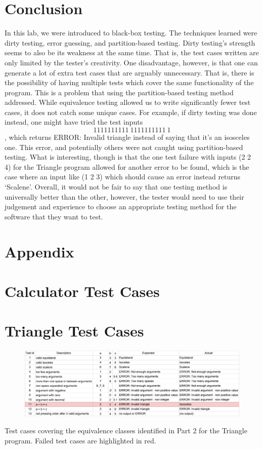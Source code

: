\documentclass[letterpaper]{article}
\begin{document}
\section*{Conclusion}
In this lab, we were introduced to black-box testing. The techniques
learned were dirty testing, error guessing, and partition-based testing.
Dirty testing's strength seems to also be its weakness at the same time. That is,
the test cases written are only limited by the tester's creativity.
One disadvantage, however, is that one can generate a lot of extra test cases
that are arguably unnecessary. That is, there is the possibility of having multiple
tests which cover the same functionality of the program. This is a problem that
using the partition-based testing method addressed. While equivalence testing allowed us 
to write significantly fewer test cases,
it does not catch some unique cases. For example, if dirty testing was done instead,
one might have tried the test inputs $$1111111111\ 1111111111\ 1$$, which returns ERROR: Invalid triangle
instead of saying that it's an isosceles one. This error, and potentially others were not
caught using partition-based testing. What is interesting, though is that the one
test failure with inputs (2 2 4) for the Triangle program allowed for another error to be found, which is
the case where an input like (1 2 3) which should cause an error instead returns `Scalene'.
Overall, it would not be fair to say that
one testing method is universally better than the other, however, the tester would
need to use their judgement and experience to choose an appropriate testing method
for the software that they want to test.

\appendix
\section*{Appendix}
\section{Calculator Test Cases} \label{calculatortestcases}


\section{Triangle Test Cases} \label{triangletestcases}
% 
\begin{table}[H]
    \begin{figure}[H]
        \centering
        \includegraphics[width=1.1\textwidth]{triangletable.png}
    \end{figure}
    \caption{Test cases covering the equivalence classes identified in Part 2 for the Triangle program. Failed test cases are highlighted in red.}
\end{table}
\end{document}
